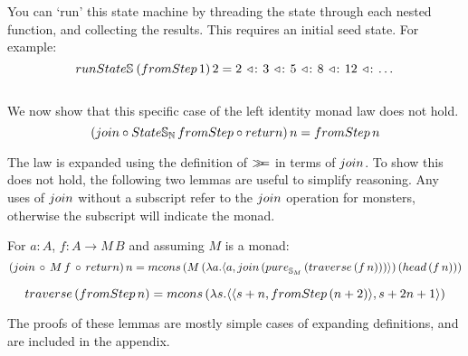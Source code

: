 You can `run' this state machine by threading the state through each nested function, and collecting the results. This requires an initial seed state. For example:
$$
\mathsf{run}\state\stream{}\,(\fromstepstr\, 1)\, 2 = 2\, \acons\, 3\, \acons\, 5\, \acons\, 8\, \acons\, 12\, \acons\, \dots
$$\\
We now show that this specific case of the left identity monad law does not hold. 
$$
(\join \comp \state\stream{\nat}\, \fromstepstr \comp \return)\, n = \fromstepstr\, n
$$

The law is expanded using the definition of $\mathbin{\gg\!\!=}$ in terms of $\join$. 
To show this does not hold, the following two lemmas are useful to simplify reasoning. Any uses of $\join$ without a subscript refer to the $\join$ operation for monsters, otherwise the subscript will indicate the monad.

\begin{lemma}\label{lemma:general_bind_law}
For $a : A$, $f : A \rightarrow M\, B$ and assuming $M$ is a monad:
$$
(\join\, \comp\,  M\, f\, \comp\, \return)\, n = \mcons\, (M\,(\lambda a . \pair{a}{\join\, (\apure_{\stream{M}}\, (\mathsf{traverse}\, (f\, n)))})\, (\head\, (f\, n)))
$$
\end{lemma}
\begin{lemma}\label{lemma:traverse_fromstepstr}
$$
\mathsf{traverse}\, (\fromstepstr\, n) = \mcons\, (\lambda s . \pair{\pair{s+n}{\fromstepstr\, (n + 2)}}{s + 2n + 1})
$$
\end{lemma} 

The proofs of these lemmas are mostly simple cases of expanding definitions, and are included in the appendix.

